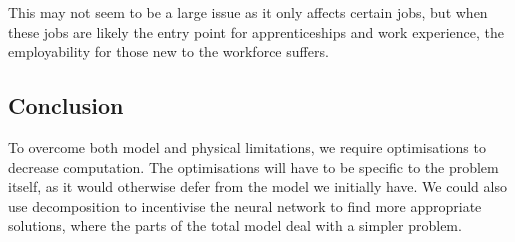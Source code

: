 This may not seem to be a large issue as it only affects certain jobs, but when these jobs are likely the entry point for apprenticeships and work experience, the employability for those new to the workforce suffers.

\subsection{Conclusion}

To overcome both model and physical limitations, we require optimisations to decrease computation. The optimisations will have to be specific to the problem itself, as it would otherwise defer from the model we initially have. We could also use decomposition to incentivise the neural network to find more appropriate solutions, where the parts of the total model deal with a simpler problem.
